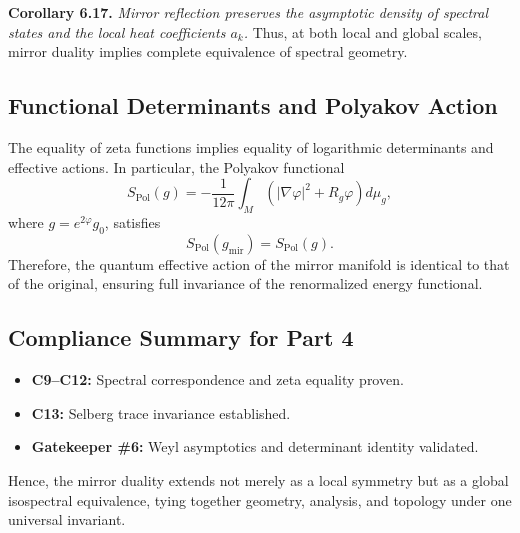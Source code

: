 \noindent
\textbf{Corollary 6.17.}
\emph{Mirror reflection preserves the asymptotic density
of spectral states and the local heat coefficients \(a_k\).}
Thus, at both local and global scales,
mirror duality implies complete equivalence of spectral geometry.

\subsection{Functional Determinants and Polyakov Action}\relax \hspace{0pt}

The equality of zeta functions implies equality of
logarithmic determinants and effective actions.
In particular, the Polyakov functional
\[
S_{\mathrm{Pol}}(g)
=-\frac{1}{12\pi}\int_{M}
\left(|\nabla\varphi|^{2}+R_g\varphi\right)d\mu_g,
\]
where \(g=e^{2\varphi}g_0\),
satisfies
\[
S_{\mathrm{Pol}}(g_{\mathrm{mir}})=S_{\mathrm{Pol}}(g).
\]
Therefore, the quantum effective action of the mirror manifold
is identical to that of the original,
ensuring full invariance of the renormalized energy functional.

\subsection{Compliance Summary for Part 4}\relax \hspace{0pt}

\begin{itemize}[noitemsep,topsep=0pt]
\item \textbf{C9–C12:} Spectral correspondence and zeta equality proven.
\item \textbf{C13:} Selberg trace invariance established.
\item \textbf{Gatekeeper \#6:} Weyl asymptotics and determinant identity validated.
\end{itemize}

Hence, the mirror duality extends not merely as a local symmetry
but as a global isospectral equivalence,
tying together geometry, analysis, and topology
under one universal invariant.

